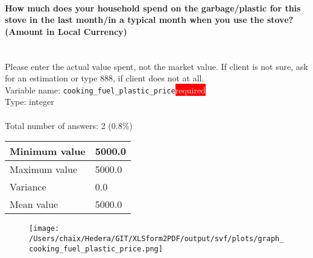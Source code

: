 \documentclass[11.5pt, a4paper]{scrartcl}
\begin{document}
\paragraph{How much  does your household spend on the garbage/plastic for this stove in the last month/in a typical month when you use the stove? (Amount in Local Currency) }
\ \\ {\small Please enter the actual value spent, not the market value. If client is not sure, ask for an estimation or type 888, if client does not at all. }
\  \\Variable name: \texttt{cooking\_fuel\_plastic\_price}\hfill\colorbox{red}{\small{\textcolor{white}{required}}}\\
 Type: integer\\
\\Total number of answers: 2 (0.8\%)
\\[0.2em] \begin{tabular}{p{4cm}|p{8cm}}
Minimum value &5000.0 \\
\hline
\cellcolor{mygray} Maximum value & \cellcolor{mygray}5000.0 \\
\hline
Variance &0.0 \\
\hline
\cellcolor{mygray} Mean value & \cellcolor{mygray}5000.0 \\
\hline
\end{tabular}
\begin{figure}[H]
\centering
\texttt{[image: /Users/chaix/Hedera/GIT/XLSform2PDF/output/svf/plots/graph\_cooking\_fuel\_plastic\_price.png]}
\end{figure}
\end{document}
